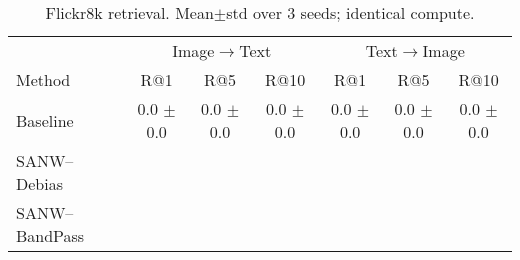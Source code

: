 
\begin{table}[t]
\centering
\small
\begin{tabular}{lcccccc}
\toprule
& \multicolumn{3}{c}{Image$\to$Text} & \multicolumn{3}{c}{Text$\to$Image} \\
Method & R@1 & R@5 & R@10 & R@1 & R@5 & R@10 \\
\midrule
Baseline & 0.0 \scriptsize$\pm$0.0 & 0.0 \scriptsize$\pm$0.0 & 0.0 \scriptsize$\pm$0.0 &
           0.0 \scriptsize$\pm$0.0 & 0.0 \scriptsize$\pm$0.0 & 0.0 \scriptsize$\pm$0.0 \\
SANW–Debias &  &  &  &
               &  &  \\
SANW–BandPass &  &  &  &
                  &  &  \\
\bottomrule
\end{tabular}
\caption{Flickr8k retrieval. Mean$\pm$std over 3 seeds; identical compute.}
\end{table}
